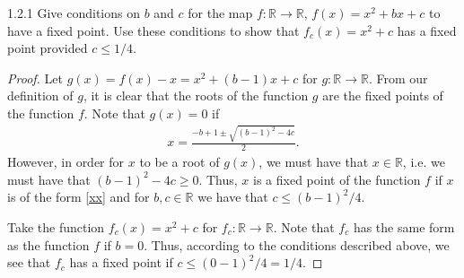 \begin{problem}{1.2.1}
  Give conditions on $b$ and $c$ for the map
  $f: \mathbb{R} \to \mathbb{R}$, $f(x) = x^2 + bx + c$ to have a fixed point.
  Use these conditions to show that $f_c(x) = x^2 + c$ has a fixed point provided $c \leq 1/4$.
\end{problem}

\begin{proof}
  Let $g(x) = f(x) - x = x^2 + (b-1)x + c$ for $g: \mathbb{R} \to \mathbb{R}$.
  From our definition of $g$, it is clear that the roots of the function $g$ are
  the fixed points of the function $f$. Note that $g(x) = 0$ if
  \begin{align}\label{xx}
    x = \frac{-b + 1 \pm \sqrt{(b-1)^2 - 4c}}{2}.
  \end{align}
  However, in order for $x$ to be a root of $g(x)$, we must have that $x \in \mathbb{R}$, i.e.
  we must have that $(b-1)^2 - 4c \geq 0$. Thus, $x$ is a fixed point of the function $f$ if
  $x$ is of the form \eqref{xx} and for $b, c \in \mathbb{R}$ we have that $c \leq (b-1)^2/4$.

  Take the function $f_c(x) = x^2 + c$ for $f_c: \mathbb{R} \to \mathbb{R}$. Note that
  $f_c$ has the same form as the function $f$ if $b=0$. Thus, according to the
  conditions described above, we see that $f_c$ has a fixed point if $c \leq (0 - 1)^2/4 = 1/4$.

\end{proof}
\newpage